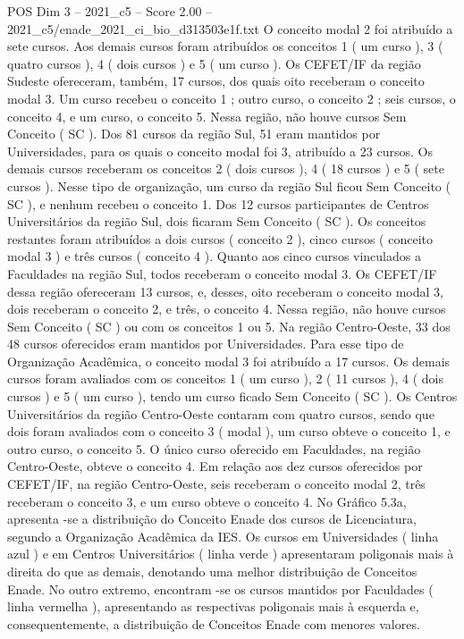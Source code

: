 \begin{textsample}{POS Dim 3 – 2021\_c5 – Score 2.00 – 2021\_c5/enade\_2021\_ci\_bio\_d313503e1f.txt}
O conceito modal 2 foi atribuído a sete cursos.
Aos demais cursos foram atribuídos os conceitos 1 ( um curso ), 3 ( quatro cursos ), 4 ( dois cursos ) e 5 ( um curso ).
Os CEFET/IF da região Sudeste ofereceram, também, 17 cursos, dos quais oito receberam o conceito modal 3.
Um curso recebeu o conceito 1 ; outro curso, o conceito 2 ; seis cursos, o conceito 4, e um curso, o conceito 5.
Nessa região, não houve cursos Sem Conceito ( SC ).
Dos 81 cursos da região Sul, 51 eram mantidos por Universidades, para os quais o conceito modal foi 3, atribuído a 23 cursos.
Os demais cursos receberam os conceitos 2 ( dois cursos ), 4 ( 18 cursos ) e 5 ( sete cursos ).
Nesse tipo de organização, um curso da região Sul ficou Sem Conceito ( SC ), e nenhum recebeu o conceito 1.
Dos 12 cursos participantes de Centros Universitários da região Sul, dois ficaram Sem Conceito ( SC ).
Os conceitos restantes foram atribuídos a dois cursos ( conceito 2 ), cinco cursos ( conceito modal 3 ) e três cursos ( conceito 4 ).
Quanto aos cinco cursos vinculados a Faculdades na região Sul, todos receberam o conceito modal 3.
Os CEFET/IF dessa região ofereceram 13 cursos, e, desses, oito receberam o conceito modal 3, dois receberam o conceito 2, e três, o conceito 4.
Nessa região, não houve cursos Sem Conceito ( SC ) ou com os conceitos 1 ou 5.
Na região Centro-Oeste, 33 dos 48 cursos oferecidos eram mantidos por Universidades.
Para esse tipo de Organização Acadêmica, o conceito modal 3 foi atribuído a 17 cursos.
Os demais cursos foram avaliados com os conceitos 1 ( um curso ), 2 ( 11 cursos ), 4 ( dois cursos ) e 5 ( um curso ), tendo um curso ficado Sem Conceito ( SC ).
Os Centros Universitários da região Centro-Oeste contaram com quatro cursos, sendo que dois foram avaliados com o conceito 3 ( modal ), um curso obteve o conceito 1, e outro curso, o conceito 5.
O único curso oferecido em Faculdades, na região Centro-Oeste, obteve o conceito 4.
Em relação aos dez cursos oferecidos por CEFET/IF, na região Centro-Oeste, seis receberam o conceito modal 2, três receberam o conceito 3, e um curso obteve o conceito 4.
No Gráfico 5.3a, apresenta -se a distribuição do Conceito Enade dos cursos de Licenciatura, segundo a Organização Acadêmica da IES.
Os cursos em Universidades ( linha azul ) e em Centros Universitários ( linha verde ) apresentaram poligonais mais à direita do que as demais, denotando uma melhor distribuição de Conceitos Enade.
No outro extremo, encontram -se os cursos mantidos por Faculdades ( linha vermelha ), apresentando as respectivas poligonais mais à esquerda e, consequentemente, a distribuição de Conceitos Enade com menores valores.

\end{textsample}
